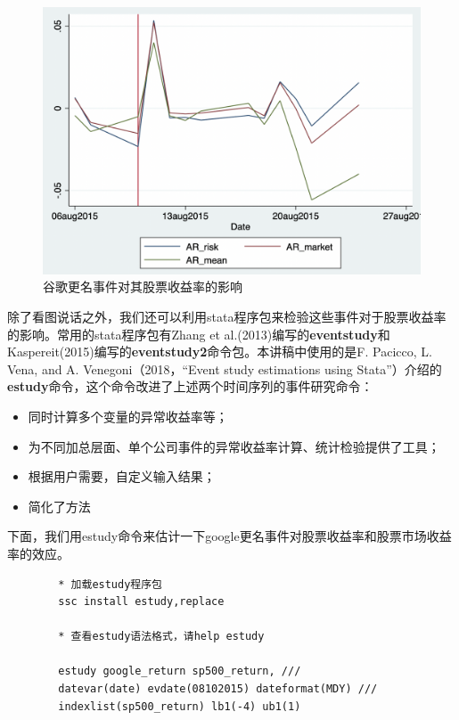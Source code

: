 \documentclass[cn,12pt,math=newtx,citestyle=gb7714-2015,bibstyle=gb7714-2015]{elegantbook}
\begin{document}
\begin{figure}[tbph]
	\centering
	\includegraphics[width=1\linewidth]{google_AR}
	\caption{谷歌更名事件对其股票收益率的影响}
	\label{fig:google_AR}
\end{figure}
	
	除了看图说话之外，我们还可以利用stata程序包来检验这些事件对于股票收益率的影响。常用的stata程序包有Zhang et al.(2013)编写的\textbf{eventstudy}和Kaspereit(2015)编写的\textbf{eventstudy2}命令包。本讲稿中使用的是F. Pacicco, L. Vena, and A. Venegoni（2018，“Event study estimations using Stata”）介绍的\textbf{estudy}命令，这个命令改进了上述两个时间序列的事件研究命令：
	
	\begin{itemize}
		\item 同时计算多个变量的异常收益率等；
		\item 为不同加总层面、单个公司事件的异常收益率计算、统计检验提供了工具；
		\item 根据用户需要，自定义输入结果；
		\item 简化了方法
	\end{itemize}
	
	下面，我们用estudy命令来估计一下google更名事件对股票收益率和股票市场收益率的效应。
	
	\begin{lstlisting}
		* 加载estudy程序包
		ssc install estudy,replace
		
		* 查看estudy语法格式，请help estudy
		
		estudy google_return sp500_return, ///
		datevar(date) evdate(08102015) dateformat(MDY) ///
		indexlist(sp500_return) lb1(-4) ub1(1)
		
	\end{lstlisting}
	
\end{document}
